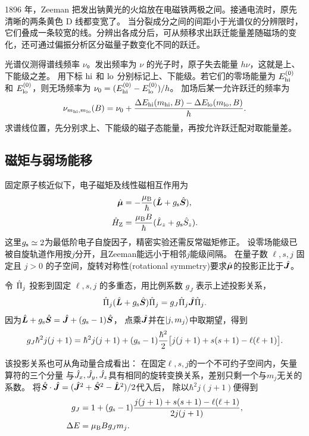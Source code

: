 1896 年，Zeeman 把发出钠黄光的火焰放在电磁铁两极之间。接通电流时，原先清晰的两条黄色 D 线都变宽了\cite{zeemanlecture}。
当分裂成分之间的间距小于光谱仪的分辨限时，它们叠成一条较宽的线。分辨出各成分后，可从频移求出跃迁能量差随磁场的变化，还可通过偏振分析区分磁量子数变化不同的跃迁。

光谱仪测得谱线频率 $\nu$。发出频率为 $\nu$ 的光子时，原子失去能量 $h\nu$，这就是上、下能级之差。
用下标 $\mathrm{hi}$ 和 $\mathrm{lo}$ 分别标记上、下能级。若它们的零场能量为 $E_{\mathrm{hi}}^{(0)}$ 和 $E_{\mathrm{lo}}^{(0)}$，则无场频率为
$\nu_0 = (E_{\mathrm{hi}}^{(0)} - E_{\mathrm{lo}}^{(0)})/h$。
加场后某一允许跃迁的频率为
\begin{equation}
    \nu_{m_{\mathrm{hi}},m_{\mathrm{lo}}}(B)
    = \nu_0 + \frac{\Delta E_{\mathrm{hi}}(m_{\mathrm{hi}},B) - \Delta E_{\mathrm{lo}}(m_{\mathrm{lo}},B)}h.
    \label{eq:zeeman-line}
\end{equation}
求谱线位置，先分别求上、下能级的磁子态能量，再按允许跃迁配对取能量差。

\subsection{磁矩与弱场能移}
\label{ss:zeeman-weak}

固定原子核近似下，电子磁矩及线性磁相互作用为
\begin{subequations}
    \begin{align}
        \hat{\bm{\mu}} &= -\frac{\mu_{\mathrm{B}}}{\hbar}(\hat{\bm{L}} + g_{\mathrm{s}}\hat{\bm{S}}),\\
        \hat{H}_{\mathrm{Z}} &= \frac{\mu_{\mathrm{B}} B}{\hbar}(\hat{L}_z + g_{\mathrm{s}}\hat{S}_z).
    \end{align}
\end{subequations}
这里$g_{\mathrm{s}} \simeq 2$为最低阶电子自旋因子，精密实验还需反常磁矩修正。
设零场能级已被自旋轨道作用按$j$分开，且Zeeman能远小于相邻$j$能级间隔。
在量子数 $\ell,s,j$ 固定且 $j > 0$ 的子空间，旋转对称性(rotational symmetry)要求$\hat{\bm{\mu}}$的投影正比于$\hat{\bm{J}}$。

令 $\hat{\Pi}_j$ 投影到固定 $\ell,s,j$ 的多重态，用比例系数 $g_J$ 表示上述投影关系，
\begin{equation}
    \hat{\Pi}_j(\hat{\bm{L}} + g_{\mathrm{s}}\hat{\bm{S}})\hat{\Pi}_j = g_J\hat{\Pi}_j\hat{\bm{J}}\hat{\Pi}_j .
\end{equation}
因为$\hat{\bm{L}} + g_{\mathrm{s}}\hat{\bm{S}} = \hat{\bm{J}} + (g_{\mathrm{s}} - 1)\hat{\bm{S}}$，
点乘$\hat{\bm{J}}$并在$\lvert j,m_j\rangle$中取期望，得到
\[
    g_J\hbar^2j(j + 1)
    = \hbar^2j(j + 1)
    + (g_{\mathrm{s}} - 1)\frac{\hbar^2}{2}
    \bigl[j(j + 1) + s(s + 1) - \ell(\ell + 1)\bigr].
\]

该投影关系也可从角动量合成看出：
在固定$\ell,s,j$的一个不可约子空间内，矢量算符的三个分量
与$\hat{J}_x,\hat{J}_y,\hat{J}_z$具有相同的旋转变换关系，差别只剩一个与$m_j$无关的系数。
将$\hat{\bm{S}} \cdot \hat{\bm{J}} = (\hat{\bm{J}}^2 + \hat{\bm{S}}^2 - \hat{\bm{L}}^2)/2$代入后，
除以$\hbar^2j(j + 1)$便得到
\begin{subequations}
    \begin{align}
        g_J &= 1 + (g_{\mathrm{s}} - 1)\frac{j(j + 1) + s(s + 1) - \ell(\ell + 1)}{2j(j + 1)},\\
        \Delta E &= \mu_{\mathrm{B}} B g_Jm_j.
    \end{align}
\end{subequations}


